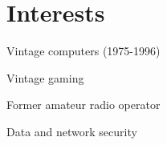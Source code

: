 \documentclass[letterpaper]{deedy-resume}
\begin{document}
\begin{minipage}[t]{0.27\textwidth}
\sectionspace

\section{Interests}
\vspace{\topsep} %

\begin{tightitemize}
	\item Vintage computers (1975-1996)
	\item Vintage gaming
	\item Former amateur radio operator
	\item Data and network security
\end{tightitemize}

\end{minipage} %
\hfill
%
\end{document}
